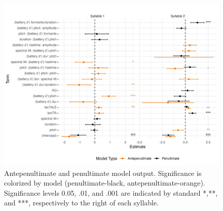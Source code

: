 
\begin{figure}[H]
  \centering
  \includegraphics[width=1\linewidth]{visuals/extended_analysis.jpeg} %
  \caption{Antepenultimate and penultimate model output. Significance is colorized by model (penultimate-black, antepenultimate-orange). Significance levels 0.05, .01, and .001 are indicated by standard *,**, and ***, respectively to the right of each syllable.}
  \label{fig:extened_analysis}
\end{figure}


